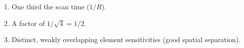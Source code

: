 \begin{enumerate}[leftmargin=1.6em,itemsep=2pt]
\item One third the scan time ($1/R$).
\item A factor of $1/\sqrt{4} = 1/2$.
\item Distinct, weakly overlapping element sensitivities (good spatial separation).
\end{enumerate}
